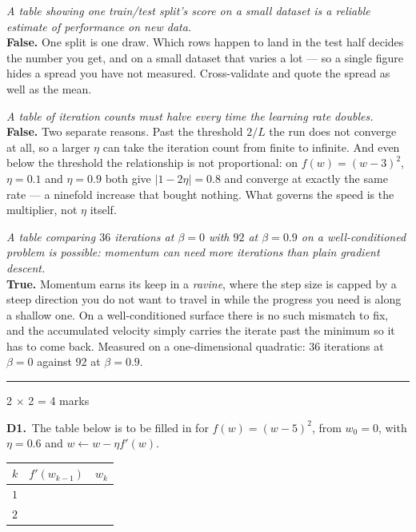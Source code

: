 \documentclass[10pt,a4paper]{article}
\newcommand{\parthead}[2]{\vspace{2pt}\noindent\rule{\linewidth}{0.4pt}\par\vspace{2pt}%
  \noindent{\bfseries Part #1}\hfill{\small #2}\par\vspace{1pt}}
\begin{document}
\begin{sC}

  \item \emph{A table showing one train/test split's score on a small dataset is a reliable estimate of performance on new data.}\\[2pt] \textbf{False.} One split is one draw. Which rows happen to land in the test half decides the number you get, and on a small dataset that varies a lot --- so a single figure hides a spread you have not measured. Cross-validate and quote the spread as well as the mean.

  \item \emph{A table of iteration counts must halve every time the learning rate doubles.}\\[2pt] \textbf{False.} Two separate reasons. Past the threshold $2/L$ the run does not converge at all, so a larger $\eta$ can take the iteration count from finite to infinite. And even below the threshold the relationship is not proportional: on $f(w) = (w-3)^2$, $\eta = 0.1$ and $\eta = 0.9$ both give $\lvert 1 - 2\eta \rvert = 0.8$ and converge at exactly the same rate --- a ninefold increase that bought nothing. What governs the speed is the multiplier, not $\eta$ itself.

  \item \emph{A table comparing $36$ iterations at $\beta = 0$ with $92$ at $\beta = 0.9$ on a well-conditioned problem is possible: momentum can need more iterations than plain gradient descent.}\\[2pt] \textbf{True.} Momentum earns its keep in a \emph{ravine}, where the step size is capped by a steep direction you do not want to travel in while the progress you need is along a shallow one. On a well-conditioned surface there is no such mismatch to fix, and the accumulated velocity simply carries the iterate past the minimum so it has to come back. Measured on a one-dimensional quadratic: $36$ iterations at $\beta = 0$ against $92$ at $\beta = 0.9$.

\end{sC}

\newpage

\parthead{D --- Short answer}{2 $\times$ 2 = 4 marks}

\textbf{D1.}\ The table below is to be filled in for $f(w) = (w-5)^2$, from $w_0 = 0$, with $\eta = 0.6$ and $w \leftarrow w - \eta f'(w)$. \par\vspace{1mm}\hspace*{6mm}\begin{tabular}{@{}lll@{}}\hline\rule{0pt}{10pt}$k$ & $f'(w_{k-1})$ & $w_k$\\[1pt]\hline\rule{0pt}{10pt}$1$ & & \\ $2$ & & \\[1pt]\hline\end{tabular}
\end{document}
